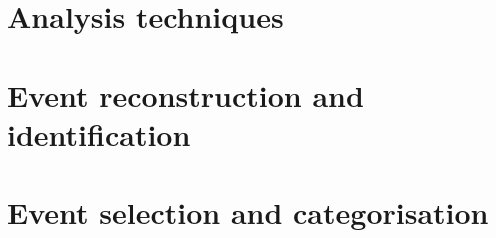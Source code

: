 
\begin{comment}

CERN ACC 2017 0007 --> beam energy uncertainty

\end{comment}


\chapter{Analysis techniques}


%

\chapter{Event reconstruction and identification}
\label{chap:4}

\chapter{Event selection and categorisation}
\label{chap:5}

